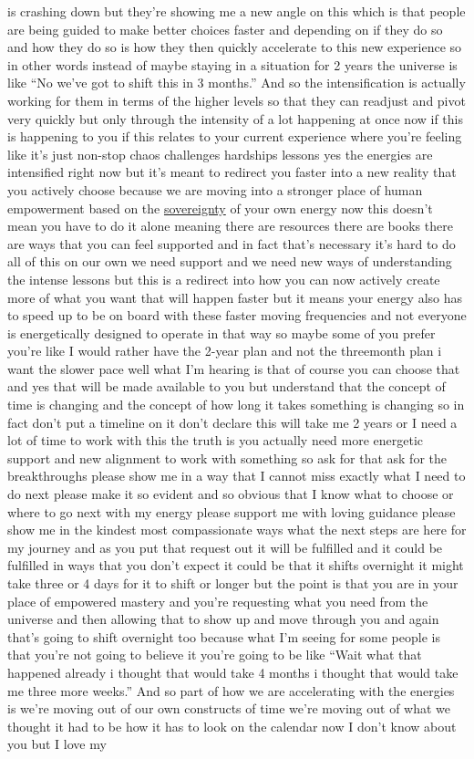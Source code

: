 \documentclass{article}
\begin{document}
is crashing down but they're showing me a new angle on this which is that people are being guided to make better choices faster and depending on if they do so and how they do so is how they then quickly accelerate to this new experience so in other words instead of maybe staying in a situation for 2 years the universe is like ``No we've got to shift this in 3 months.'' And so the intensification is actually working for them in terms of the higher levels so that they can readjust and pivot very quickly but only through the intensity of a lot happening at once now if this is happening to you if this relates to your current experience where you're feeling like it's just non-stop chaos challenges hardships lessons yes the energies are intensified right now but it's meant to redirect you faster into a new reality that you actively choose because we are moving into a stronger place of human empowerment based on the \hyperlink{gloss:sovereignty}{sovereignty} of your own energy now this doesn't mean you have to do it alone meaning there are resources there are books there are ways that you can feel supported and in fact that's necessary it's hard to do all of this on our own we need support and we need new ways of understanding the intense lessons but this is a redirect into how you can now actively create more of what you want that will happen faster but it means your energy also has to speed up to be on board with these faster moving frequencies and not everyone is energetically designed to operate in that way so maybe some of you prefer you're like I would rather have the 2-year plan and not the threemonth plan i want the slower pace well what I'm hearing is that of course you can choose that and yes that will be made available to you but understand that the concept of time is changing and the concept of how long it takes something is changing so in fact don't put a timeline on it don't declare this will take me 2 years or I need a lot of time to work with this the truth is you actually need more energetic support and new alignment to work with something so ask for that ask for the breakthroughs please show me in a way that I cannot miss exactly what I need to do next please make it so evident and so obvious that I know what to choose or where to go next with my energy please support me with loving guidance please show me in the kindest most compassionate ways what the next steps are here for my journey and as you put that request out it will be fulfilled and it could be fulfilled in ways that you don't expect it could be that it shifts overnight it might take three or 4 days for it to shift or longer but the point is that you are in your place of empowered mastery and you're requesting what you need from the universe and then allowing that to show up and move through you and again that's going to shift overnight too because what I'm seeing for some people is that you're not going to believe it you're going to be like ``Wait what that happened already i thought that would take 4 months i thought that would take me three more weeks.'' And so part of how we are accelerating with the energies is we're moving out of our own constructs of time we're moving out of what we thought it had to be how it has to look on the calendar now I don't know about you but I love my 
\end{document}
